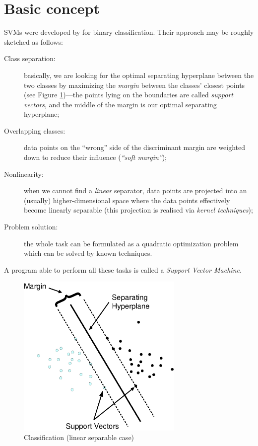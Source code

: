 \documentclass[a4paper]{article}
\begin{document}
\section*{Basic concept}
SVMs were developed by \cite{svm:cortes+vapnik:1995} for binary
classification. Their approach may be roughly sketched as follows:

\begin{description}
 \item[Class separation:] basically, we are looking for the optimal separating hyperplane
  between the two classes by maximizing the
  \textit{margin} between the classes' closest points (see Figure
  \ref{fig:svm1})---the points lying on the boundaries are called \textit{support vectors}, and
  the middle of the margin is our optimal separating hyperplane;
 \item[Overlapping classes:] data points on the ``wrong'' side
  of the discriminant margin are weighted down to reduce their influence (\textit{``soft margin''});
 \item[Nonlinearity:] when we cannot
  find a \textit{linear} separator, data points are projected into an 
  (usually) higher-dimensional space where the data points effectively
  become linearly separable (this projection is realised via \textit{kernel
    techniques});
 \item[Problem solution:] the whole task can be formulated as a
  quadratic optimization problem which can be solved by known techniques.
\end{description}
\noindent A program able to perform all these tasks is called a \textit{Support
  Vector Machine}.

\begin{figure}[htbp]
  \begin{center}
    \includegraphics[width=8cm]{svm}
    \caption{Classification (linear separable case)}
    \label{fig:svm1}
  \end{center}
\end{figure}
\end{document}
